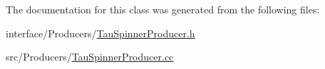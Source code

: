 The documentation for this class was generated from the following files:\begin{DoxyCompactItemize}
\item 
interface/Producers/\hyperlink{TauSpinnerProducer_8h}{TauSpinnerProducer.h}\item 
src/Producers/\hyperlink{TauSpinnerProducer_8cc}{TauSpinnerProducer.cc}\end{DoxyCompactItemize}

